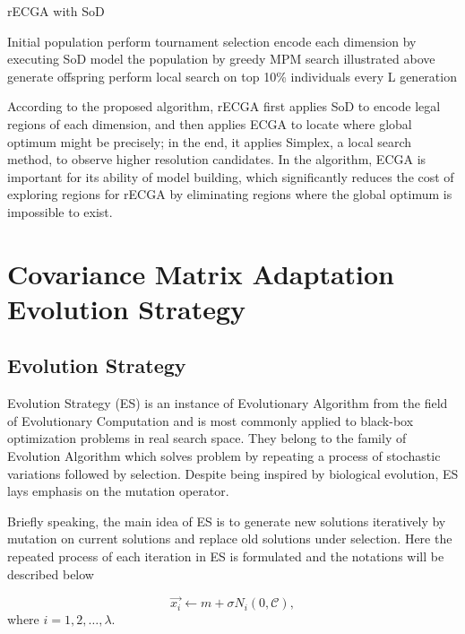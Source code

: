 \begin{algorithm}  \caption{rECGA with SoD} \label{alg:rECGA}Initial
  population\;  { perform tournament
    selection\; encode each dimension by executing SoD\; model the
    population by greedy MPM search illustrated above\; generate
  offspring\; perform local search on top 10\% individuals every L
generation } \end{algorithm} 

According to the proposed algorithm, rECGA first applies SoD to encode
legal regions of each dimension, and then applies ECGA to locate where
global optimum might be precisely; in the end, it applies Simplex, a
local search method, to observe higher resolution candidates.  In the
algorithm, ECGA is important for its ability of model building, which
significantly reduces the cost of exploring regions for rECGA by
eliminating regions where the global optimum is impossible to exist.

\section{Covariance Matrix Adaptation Evolution Strategy}
\label{sec:CMA-ES}


\subsection{Evolution Strategy} \label{ES}

Evolution Strategy (ES) is an instance of Evolutionary Algorithm from
the field of Evolutionary Computation and is most commonly applied to
black-box optimization problems in real search space.  They belong to
the family of Evolution Algorithm which solves problem by repeating a
process of stochastic variations followed by selection.  Despite being
inspired by biological evolution, ES lays emphasis on the mutation
operator.

Briefly speaking, the main idea of ES is to generate new solutions
iteratively by mutation on current solutions and replace old solutions
under selection.  Here the repeated process of each iteration in ES is
formulated and the notations will be described below

  \[\vec{x_i} \leftarrow m + \sigma N_i(0,\mathcal{C}),\]
where $i = 1,2,\ldots, \lambda$.



